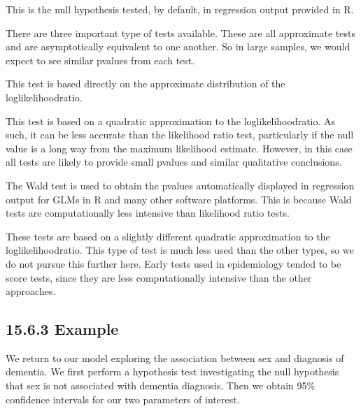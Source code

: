 \documentclass[letterpaper,10pt,english]{jupyterBook}
\begin{document}
\sphinxAtStartPar
This is the null hypothesis tested, by default, in regression output provided in R.

\sphinxAtStartPar
There are three important type of tests available. These are all approximate tests and are asymptotically equivalent to one another. So in large samples, we would expect to see similar p\sphinxhyphen{}values from each test.

\sphinxAtStartPar
{} This test is based directly on the approximate distribution of the log\sphinxhyphen{}likelihood\sphinxhyphen{}ratio.

\sphinxAtStartPar
{}  This test is based on a quadratic approximation to the log\sphinxhyphen{}likelihood\sphinxhyphen{}ratio. As such, it can be less accurate than the likelihood ratio test, particularly if the null value is a long way from the maximum likelihood estimate. However, in this case all tests are likely to provide small p\sphinxhyphen{}values and similar qualitative conclusions.

\sphinxAtStartPar
The Wald test is used to obtain the p\sphinxhyphen{}values automatically displayed in regression output for GLMs in R and many other software platforms. This is because Wald tests are computationally less intensive than likelihood ratio tests.

\sphinxAtStartPar
{} These tests are based on a slightly different quadratic approximation to the log\sphinxhyphen{}likelihood\sphinxhyphen{}ratio. This type of test is much less used than the other types, so we do not pursue this further here. Early tests used in epidemiology tended to be score tests, since they are less computationally intensive than the other approaches.


\subsection{15.6.3 Example}
\label{\detokenize{15.g. Logistic Regression:example}}
\sphinxAtStartPar
We return to our model exploring the association between sex and diagnosis of dementia. We first perform a hypothesis test investigating the null hypothesis that sex is not associated with dementia diagnosis. Then we obtain 95\% confidence intervals for our two parameters of interest.

\begin{sphinxVerbatim}[commandchars=\\\{\}]
  
          
\end{sphinxVerbatim}
\end{document}
